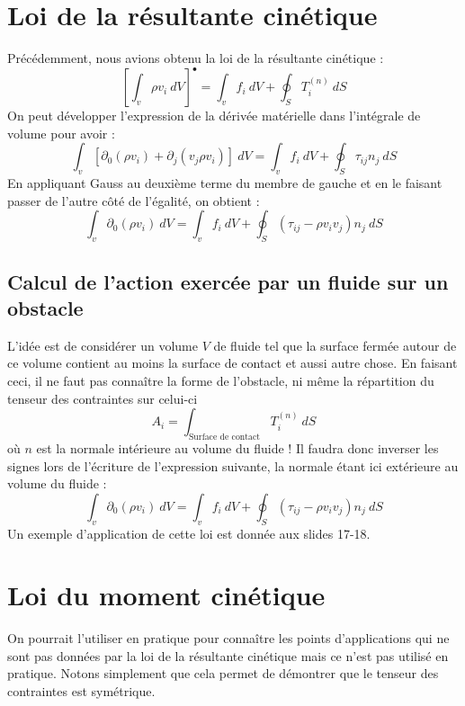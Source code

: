     

\section{Loi de la résultante cinétique}
Précédemment, nous avions obtenu la loi de la résultante cinétique :
\begin{equation}
\left[\int_v \rho v_i\ dV\right]^\bullet = \int_v f_i\ dV + \oint_S T_i^{(n)}\ dS
\end{equation}
On peut développer l'expression de la dérivée matérielle dans l'intégrale de volume pour avoir :
\begin{equation}
\int_v [\partial_0(\rho v_i) + \partial_j(v_j\rho v_i)]\ dV = \int_v f_i\ dV + \oint_S \tau_{ij}n_j\ dS
\end{equation}
En appliquant Gauss au deuxième terme du membre de gauche et en le faisant passer de l'autre côté 
de l'égalité, on obtient :
\begin{equation}
\int_v \partial_0(\rho v_i)\ dV = \int_v f_i\ dV + \oint_S (\tau_{ij} - \rho v_i v_j)n_j\ dS
\end{equation}

    
    \subsection{Calcul de l'action exercée par un fluide sur un obstacle}
    L'idée est de considérer un volume $V$ de fluide tel que la surface fermée autour de ce volume
    contient au moins la surface de contact et aussi autre chose. En faisant ceci, il ne faut pas
    connaître la forme de l'obstacle, ni même la répartition du tenseur des contraintes sur celui-ci 
    \begin{equation}
    A_i = \int_{\text{Surface de contact}} T_i^{(n)}\ dS
    \end{equation}
    où $n$ est la normale intérieure au volume du fluide ! Il faudra donc inverser les signes lors
    de l'écriture de l'expression suivante, la normale étant ici extérieure au volume du fluide :
    \begin{equation}
    \int_v \partial_0(\rho v_i)\ dV = \int_v f_i\ dV + \oint_S (\tau_{ij} - \rho v_i v_j)n_j\ dS
    \end{equation}
    Un exemple d'application de cette loi est donnée aux slides 17-18.




\section{Loi du moment cinétique}
On pourrait l'utiliser en pratique pour connaître les points d'applications qui ne sont pas données
par la loi de la résultante cinétique mais ce n'est pas utilisé en pratique. Notons simplement que
cela permet de démontrer que le tenseur des contraintes est symétrique.


